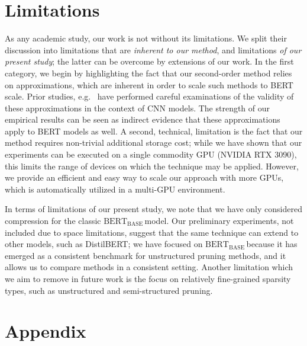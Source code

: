 \documentclass[11pt]{article}
\newcommand{\bert}{$\textrm{BERT}_{\textrm{BASE}}\,$}
\begin{document}
\section{Limitations}

As any academic study, our work is not without its limitations. 
We split their discussion into limitations that are  \emph{inherent to our method}, and limitations \emph{of our present study}; the latter can be overcome by extensions of our work.
In the first category, we begin by highlighting the fact that our second-order method relies on approximations, which are inherent in order to scale such methods to BERT scale. 
Prior studies, e.g.~\cite{Singh2020WoodFisherES} have performed careful examinations of the validity of these approximations in the context of CNN models. 
The strength of our empirical results can be seen as indirect evidence that these approximations apply to BERT models as well. 
A second, technical, limitation is the fact that our method requires non-trivial additional storage cost; while we have shown that our experiments can be executed on a single commodity GPU (NVIDIA RTX 3090), this limits the range of devices on which the technique may be applied. However, we provide an efficient and easy way to scale our approach with more GPUs, which is automatically utilized in a multi-GPU environment.  

In terms of limitations of our present study, we note that we have only considered compression for the classic \bert model. Our preliminary experiments, not included due to space limitations, suggest that the same technique can extend to other models, such as DistilBERT; we have focused on \bert because it has emerged as a consistent benchmark for unstructured pruning methods, and it allows us to compare methods in a consistent setting.
Another limitation which we aim to remove in future work is the focus on relatively fine-grained sparsity types, such as unstructured and semi-structured pruning. 






\appendix
\section{Appendix}
\label{sec:appendix}
\end{document}
